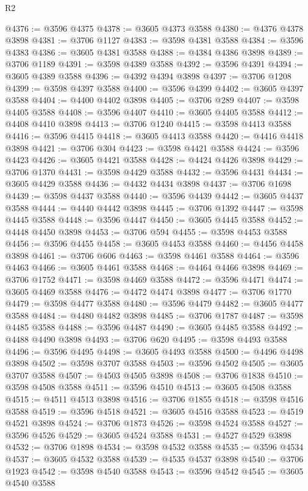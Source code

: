 \begin{lexlean}{R2}
\begin{coremodule}
@4376 := @3596 @4375
@4378 := @3605 @4373 @3588
@4380 := @4376 @4378 @3898
@4381 := @3706 @1127
@4383 := @3598 @4381 @3588
@4384 := @3596 @4383
@4386 := @3605 @4381 @3588
@4388 := @4384 @4386 @3898
@4389 := @3706 @1189
@4391 := @3598 @4389 @3588
@4392 := @3596 @4391
@4394 := @3605 @4389 @3588
@4396 := @4392 @4394 @3898
@4397 := @3706 @1208
@4399 := @3598 @4397 @3588
@4400 := @3596 @4399
@4402 := @3605 @4397 @3588
@4404 := @4400 @4402 @3898
@4405 := @3706 @289
@4407 := @3598 @4405 @3588
@4408 := @3596 @4407
@4410 := @3605 @4405 @3588
@4412 := @4408 @4410 @3898
@4413 := @3706 @1240
@4415 := @3598 @4413 @3588
@4416 := @3596 @4415
@4418 := @3605 @4413 @3588
@4420 := @4416 @4418 @3898
@4421 := @3706 @304
@4423 := @3598 @4421 @3588
@4424 := @3596 @4423
@4426 := @3605 @4421 @3588
@4428 := @4424 @4426 @3898
@4429 := @3706 @1370
@4431 := @3598 @4429 @3588
@4432 := @3596 @4431
@4434 := @3605 @4429 @3588
@4436 := @4432 @4434 @3898
@4437 := @3706 @1698
@4439 := @3598 @4437 @3588
@4440 := @3596 @4439
@4442 := @3605 @4437 @3588
@4444 := @4440 @4442 @3898
@4445 := @3706 @1392
@4447 := @3598 @4445 @3588
@4448 := @3596 @4447
@4450 := @3605 @4445 @3588
@4452 := @4448 @4450 @3898
@4453 := @3706 @594
@4455 := @3598 @4453 @3588
@4456 := @3596 @4455
@4458 := @3605 @4453 @3588
@4460 := @4456 @4458 @3898
@4461 := @3706 @606
@4463 := @3598 @4461 @3588
@4464 := @3596 @4463
@4466 := @3605 @4461 @3588
@4468 := @4464 @4466 @3898
@4469 := @3706 @1752
@4471 := @3598 @4469 @3588
@4472 := @3596 @4471
@4474 := @3605 @4469 @3588
@4476 := @4472 @4474 @3898
@4477 := @3706 @1770
@4479 := @3598 @4477 @3588
@4480 := @3596 @4479
@4482 := @3605 @4477 @3588
@4484 := @4480 @4482 @3898
@4485 := @3706 @1787
@4487 := @3598 @4485 @3588
@4488 := @3596 @4487
@4490 := @3605 @4485 @3588
@4492 := @4488 @4490 @3898
@4493 := @3706 @620
@4495 := @3598 @4493 @3588
@4496 := @3596 @4495
@4498 := @3605 @4493 @3588
@4500 := @4496 @4498 @3898
@4502 := @3598 @3707 @3588
@4503 := @3596 @4502
@4505 := @3605 @3707 @3588
@4507 := @4503 @4505 @3898
@4508 := @3706 @1838
@4510 := @3598 @4508 @3588
@4511 := @3596 @4510
@4513 := @3605 @4508 @3588
@4515 := @4511 @4513 @3898
@4516 := @3706 @1855
@4518 := @3598 @4516 @3588
@4519 := @3596 @4518
@4521 := @3605 @4516 @3588
@4523 := @4519 @4521 @3898
@4524 := @3706 @1873
@4526 := @3598 @4524 @3588
@4527 := @3596 @4526
@4529 := @3605 @4524 @3588
@4531 := @4527 @4529 @3898
@4532 := @3706 @1898
@4534 := @3598 @4532 @3588
@4535 := @3596 @4534
@4537 := @3605 @4532 @3588
@4539 := @4535 @4537 @3898
@4540 := @3706 @1923
@4542 := @3598 @4540 @3588
@4543 := @3596 @4542
@4545 := @3605 @4540 @3588

\end{coremodule}
\end{lexlean}
